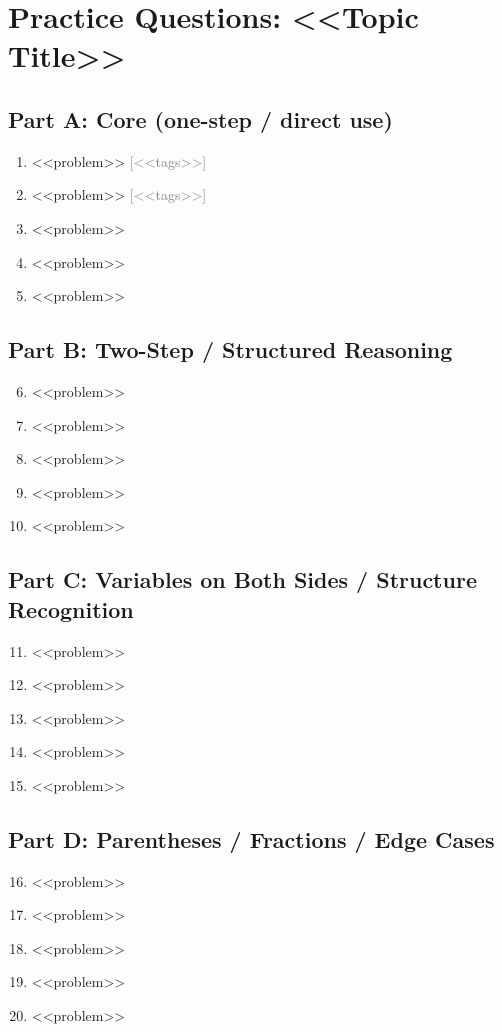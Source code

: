 \documentclass[14pt]{extarticle}
\newcommand{\qtag}[1]{\textcolor{gray}{\footnotesize [#1]}}
\newenvironment{PracticePart}[1]{%
  \subsection*{Part #1}%
  \begin{enumerate}
}{%
  \end{enumerate}
}
\newenvironment{SpeedCheck}{%
  \subsection*{Speed Check (3 quick items)}
  \begin{enumerate}
}{%
  \end{enumerate}
}
\begin{document}
\newpage

\section*{Practice Questions: <<Topic Title>>}


\begin{PracticePart}{A: Core (one-step / direct use)}
  \item <<problem>> \qtag{<<tags>>}
  \item <<problem>> \qtag{<<tags>>}
  \item <<problem>>
  \item <<problem>>
  \item <<problem>>
\end{PracticePart}

\begin{PracticePart}{B: Two-Step / Structured Reasoning}
  \setcounter{enumi}{5}
  \item <<problem>>
  \item <<problem>>
  \item <<problem>>
  \item <<problem>>
  \item <<problem>>
\end{PracticePart}

\begin{PracticePart}{C: Variables on Both Sides / Structure Recognition}
  \setcounter{enumi}{10}
  \item <<problem>>
  \item <<problem>>
  \item <<problem>>
  \item <<problem>>
  \item <<problem>>
\end{PracticePart}

\begin{PracticePart}{D: Parentheses / Fractions / Edge Cases}
  \setcounter{enumi}{15}
  \item <<problem>>
  \item <<problem>>
  \item <<problem>>
  \item <<problem>>
  \item <<problem>>
\end{PracticePart}
\end{document}
